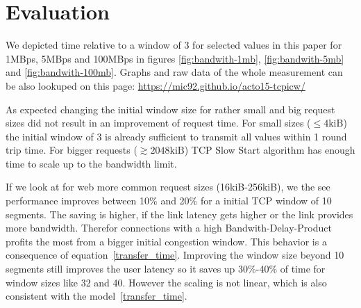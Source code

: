 \section{Evaluation}
\label{sec:evaluation}

We depicted time relative to a window of 3 for selected values in this paper for
1MBps, 5MBps and 100MBps in figures \ref{fig:bandwith-1mb},
\ref{fig:bandwith-5mb} and \ref{fig:bandwith-100mb}. Graphs and raw data of the
whole measurement can be also lookuped on this page:
\url{https://mic92.github.io/acto15-tcpicw/}

As expected changing the initial window size for rather small and big request
sizes did not result in an improvement of request time. For small sizes
($\leq{}4\text{kiB}$) the initial window of 3 is already sufficient to transmit
all values within 1 round trip time. For bigger requests
($\gtrsim{}2048\text{kiB}$) TCP Slow Start algorithm has enough time to scale up
to the bandwidth limit.

If we look at for web more common request sizes (16kiB-256kiB), we the see
performance improves between 10\% and 20\% for a initial TCP window of 10
segments. The saving is higher, if the link latency gets higher or the link
provides more bandwidth. Therefor connections with a high Bandwith-Delay-Product
profits the most from a bigger initial congestion window. This behavior is a
consequence of equation~\ref{transfer_time}. Improving the window size beyond 10
segments still improves the user latency so it saves up 30\%-40\% of time for
window sizes like 32 and 40. However the scaling is not linear, which is also
consistent with the model~\ref{transfer_time}.



%
%
